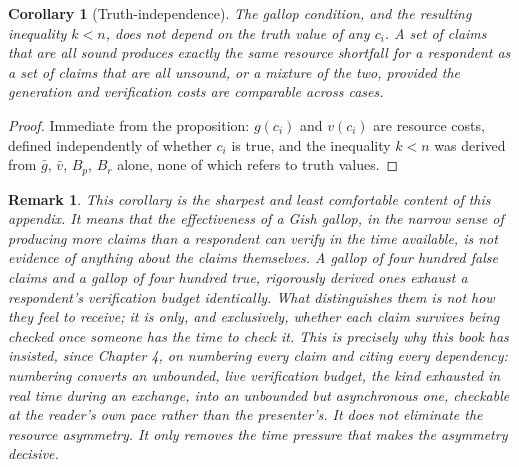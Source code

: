 \documentclass[11pt]{book}
\newtheorem*{appendixcorollary}{Corollary}
\newtheorem*{appendixremark}{Remark}
\begin{document}
\begin{appendixcorollary}[Truth-independence]
The gallop condition, and the resulting inequality $k < n$, does not depend on the truth value of any $c_i$. A set of claims that are all sound produces exactly the same resource shortfall for a respondent as a set of claims that are all unsound, or a mixture of the two, provided the generation and verification costs are comparable across cases.
\end{appendixcorollary}

\begin{proof}
Immediate from the proposition: $g(c_i)$ and $v(c_i)$ are resource costs, defined independently of whether $c_i$ is true, and the inequality $k < n$ was derived from $\bar g$, $\bar v$, $B_p$, $B_r$ alone, none of which refers to truth values.
\end{proof}

\begin{appendixremark}
This corollary is the sharpest and least comfortable content of this appendix. It means that the effectiveness of a Gish gallop, in the narrow sense of producing more claims than a respondent can verify in the time available, is not evidence of anything about the claims themselves. A gallop of four hundred false claims and a gallop of four hundred true, rigorously derived ones exhaust a respondent's verification budget identically. What distinguishes them is not how they feel to receive; it is only, and exclusively, whether each claim survives being checked once someone has the time to check it. This is precisely why this book has insisted, since Chapter 4, on numbering every claim and citing every dependency: numbering converts an unbounded, live verification budget, the kind exhausted in real time during an exchange, into an unbounded but asynchronous one, checkable at the reader's own pace rather than the presenter's. It does not eliminate the resource asymmetry. It only removes the time pressure that makes the asymmetry decisive.
\end{appendixremark}
\end{document}
